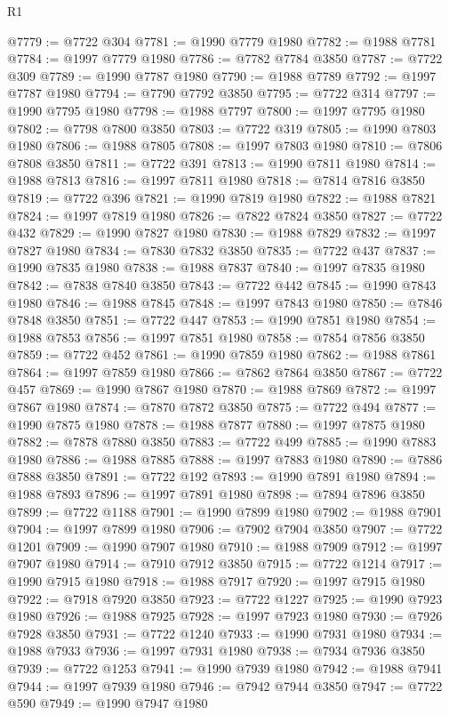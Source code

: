 \begin{lexlean}{R1}
\begin{coremodule}
@7779 := @7722 @304
@7781 := @1990 @7779 @1980
@7782 := @1988 @7781
@7784 := @1997 @7779 @1980
@7786 := @7782 @7784 @3850
@7787 := @7722 @309
@7789 := @1990 @7787 @1980
@7790 := @1988 @7789
@7792 := @1997 @7787 @1980
@7794 := @7790 @7792 @3850
@7795 := @7722 @314
@7797 := @1990 @7795 @1980
@7798 := @1988 @7797
@7800 := @1997 @7795 @1980
@7802 := @7798 @7800 @3850
@7803 := @7722 @319
@7805 := @1990 @7803 @1980
@7806 := @1988 @7805
@7808 := @1997 @7803 @1980
@7810 := @7806 @7808 @3850
@7811 := @7722 @391
@7813 := @1990 @7811 @1980
@7814 := @1988 @7813
@7816 := @1997 @7811 @1980
@7818 := @7814 @7816 @3850
@7819 := @7722 @396
@7821 := @1990 @7819 @1980
@7822 := @1988 @7821
@7824 := @1997 @7819 @1980
@7826 := @7822 @7824 @3850
@7827 := @7722 @432
@7829 := @1990 @7827 @1980
@7830 := @1988 @7829
@7832 := @1997 @7827 @1980
@7834 := @7830 @7832 @3850
@7835 := @7722 @437
@7837 := @1990 @7835 @1980
@7838 := @1988 @7837
@7840 := @1997 @7835 @1980
@7842 := @7838 @7840 @3850
@7843 := @7722 @442
@7845 := @1990 @7843 @1980
@7846 := @1988 @7845
@7848 := @1997 @7843 @1980
@7850 := @7846 @7848 @3850
@7851 := @7722 @447
@7853 := @1990 @7851 @1980
@7854 := @1988 @7853
@7856 := @1997 @7851 @1980
@7858 := @7854 @7856 @3850
@7859 := @7722 @452
@7861 := @1990 @7859 @1980
@7862 := @1988 @7861
@7864 := @1997 @7859 @1980
@7866 := @7862 @7864 @3850
@7867 := @7722 @457
@7869 := @1990 @7867 @1980
@7870 := @1988 @7869
@7872 := @1997 @7867 @1980
@7874 := @7870 @7872 @3850
@7875 := @7722 @494
@7877 := @1990 @7875 @1980
@7878 := @1988 @7877
@7880 := @1997 @7875 @1980
@7882 := @7878 @7880 @3850
@7883 := @7722 @499
@7885 := @1990 @7883 @1980
@7886 := @1988 @7885
@7888 := @1997 @7883 @1980
@7890 := @7886 @7888 @3850
@7891 := @7722 @192
@7893 := @1990 @7891 @1980
@7894 := @1988 @7893
@7896 := @1997 @7891 @1980
@7898 := @7894 @7896 @3850
@7899 := @7722 @1188
@7901 := @1990 @7899 @1980
@7902 := @1988 @7901
@7904 := @1997 @7899 @1980
@7906 := @7902 @7904 @3850
@7907 := @7722 @1201
@7909 := @1990 @7907 @1980
@7910 := @1988 @7909
@7912 := @1997 @7907 @1980
@7914 := @7910 @7912 @3850
@7915 := @7722 @1214
@7917 := @1990 @7915 @1980
@7918 := @1988 @7917
@7920 := @1997 @7915 @1980
@7922 := @7918 @7920 @3850
@7923 := @7722 @1227
@7925 := @1990 @7923 @1980
@7926 := @1988 @7925
@7928 := @1997 @7923 @1980
@7930 := @7926 @7928 @3850
@7931 := @7722 @1240
@7933 := @1990 @7931 @1980
@7934 := @1988 @7933
@7936 := @1997 @7931 @1980
@7938 := @7934 @7936 @3850
@7939 := @7722 @1253
@7941 := @1990 @7939 @1980
@7942 := @1988 @7941
@7944 := @1997 @7939 @1980
@7946 := @7942 @7944 @3850
@7947 := @7722 @590
@7949 := @1990 @7947 @1980

\end{coremodule}
\end{lexlean}
